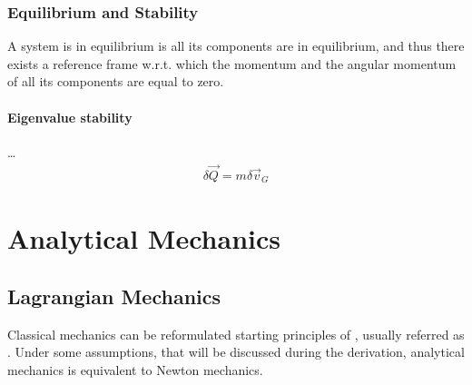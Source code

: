 \documentclass[letterpaper,10pt,english]{jupyterBook}
\begin{document}
\sphinxstepscope


\section{Equilibrium and Stability}
\label{\detokenize{ch/dynamics-equilibrium-stability:equilibrium-and-stability}}\label{\detokenize{ch/dynamics-equilibrium-stability:classical-mechanics-dynamics-equilibrium-and-stability}}\label{\detokenize{ch/dynamics-equilibrium-stability::doc}}
\sphinxAtStartPar
A system is in equilibrium is all its components are in equilibrium, and thus there exists a reference frame w.r.t. which the momentum and the angular momentum of all its components are equal to zero.


\subsection{Eigenvalue stability}
\label{\detokenize{ch/dynamics-equilibrium-stability:eigenvalue-stability}}
\sphinxAtStartPar
…
\begin{equation*}
\begin{split}\delta \vec{Q} = m \delta \vec{v}_G\end{split}
\end{equation*}

\subsection{}
\label{\detokenize{ch/dynamics-equilibrium-stability:id1}}
\sphinxstepscope


\part{Analytical Mechanics}

\sphinxstepscope




\chapter{Lagrangian Mechanics}
\label{\detokenize{ch/lagrange:lagrangian-mechanics}}\label{\detokenize{ch/lagrange:classical-mechanics-lagrange}}\label{\detokenize{ch/lagrange::doc}}
\sphinxAtStartPar
Classical mechanics can be re\sphinxhyphen{}formulated starting principles of , usually referred as . Under some assumptions, that will be discussed during the derivation, analytical mechanics is equivalent to Newton mechanics.
\end{document}

